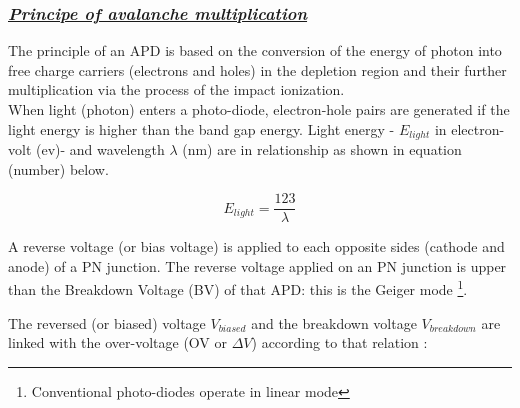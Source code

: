 \documentclass[a4paper, 11pt]{report}%
\begin{document}
  \subsubsection{\textit{\underline{Principe of avalanche multiplication}}}
  
  The principle of an APD is based on the conversion of the energy of photon into free charge carriers (electrons and 
  holes) in the depletion region
  and their further multiplication via the process of the impact ionization. 
  \\
  When light (photon) enters a photo-diode, electron-hole pairs are generated if 
  the light energy is higher than the band gap energy. Light energy - $E_{light}$ in electron-volt (ev)- and wavelength $\lambda$ (nm)
  are in relationship as shown in equation (number) below. 
  
  \begin{equation}
   E_{light} = \frac{123}{\lambda}
  \end{equation}
  
  A reverse voltage (or bias voltage) is applied to each opposite sides (cathode and anode) of a PN junction. 
  The reverse voltage applied on an PN junction is upper than the Breakdown Voltage (BV) of that 
  APD: this is the Geiger mode \footnote{Conventional photo-diodes operate in linear mode}.  
  
  
  The reversed (or biased) voltage $V_{biased}$ and the breakdown voltage $V_{breakdown}$ are linked with the over-voltage (OV or $\Delta V$) according to that relation :
  
\end{document}
